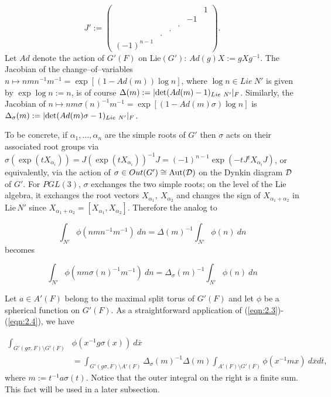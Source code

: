 \documentclass[12pt,letterpaper]{article}
\def\ddd{{\cal D}}
\def\ovx{\overline{x}}
\def\ovt{\overline{t}}
\begin{document}
\[
J':=
\left(
\begin{array}{cccccc}
 \ &\ &\ &\ &\ &1\\
\ &\ &\ &\ &-1&\ \\
\ &\ &\ &.&\ &\ \\
\ &\ &.&\ &\ &\ \\
\ &.&\ &\ &\ &\ \\
(-1)^{n-1}&\ &\ &\ &\ &\
\end{array}
\right) .
\]
Let $Ad$ denote the action of $G'(F)$ on Lie$(G')$:
$Ad(g)X :=gXg^{-1}$. 
The Jacobian of the change--of--variables
$n\longmapsto nmn^{-1}m^{-1} =\exp[(1-Ad(m))\log n]$,
where $\log n\in Lie\  N'$ is given by $\exp \log n :=n$, is
of course $\Delta (m) := |{\rm det} (Ad(m)-1)_{Lie\ N'}|_F $.
Similarly, the Jacobian of $n\longmapsto nm\sigma (n)^{-1}m^{-1}
=\exp [(1-Ad(m)\sigma )\log n]$ is $\Delta_{\sigma}(m) := |{\rm det}
(Ad(m)\sigma - 1)_{Lie\ N'}|_F$.
 
To be concrete, if $\alpha_1,\dots,\alpha_n$ are the simple roots of $G'$ then
$\sigma$ acts on their associated root groups via
$\sigma (\exp (tX_{\alpha_i})) = J(\exp (tX_{\alpha_i}))^{-1}J
= (-1)^{n-1}\exp (-tJ{^{t}X}_{\alpha_i}J)$,
or equivalently, via the action of $\sigma \in Out(G')\cong
{\rm Aut}(\ddd )$ on the Dynkin diagram $\ddd $ of $G'$. 
For $PGL(3)$, $\sigma$ exchanges the two simple roots; on the level of the
Lie algebra, it exchanges the root vectors $X_{\alpha_1},
\ X_{\alpha_2}$ and changes the sign of $X_{\alpha_1+\alpha_2}$
in Lie$\,N'$ since $X_{\alpha_1+\alpha_2}=[X_{\alpha_1},X_{\alpha_2}]$.
Therefore the analog to

\begin{equation}
\label{eqn:2.3}
\int_{N'} \phi (nmn^{-1}m^{-1})\ dn
= \Delta (m)^{-1}\int_{N'} \phi (n)\ dn 
\end{equation}
becomes

\begin{equation}
\label{eqn:2.4}
\int_{N'} \phi (nm\sigma (n)^{-1}m^{-1})\ dn
= \Delta_{\sigma}(m)^{-1}\int_{N'} \phi (n)\ dn 
\end{equation}
 
Let $a\in A'(F)$
belong to the maximal split torus of $G'(F)$ and let $\phi$ be a spherical
function on $G'(F)$. As a straightforward application of 
(\ref{eqn:2.3})-(\ref{eqn:2.4}), we
have

\begin{equation}
\label{eqn:2.5}
\begin{split}
\int_{G'(g\sigma ,F)\setminus G'(F)}
&\phi (x^{-1}g\sigma (x))\ d\ovx\\
&=\int_{G'(g\sigma ,F)\setminus A'(F)}\Delta_{\sigma}(m)^{-1}\Delta (m)
\int_{A'(F)\setminus G'(F)} \phi (x^{-1}mx)\ d\ovx d\ovt ,
\end{split}
\end{equation}
where $m:=t^{-1}a\sigma (t)$. Notice that the outer integral on the
right is a finite sum. This fact will be used in a later subsection.
 
\end{document}
